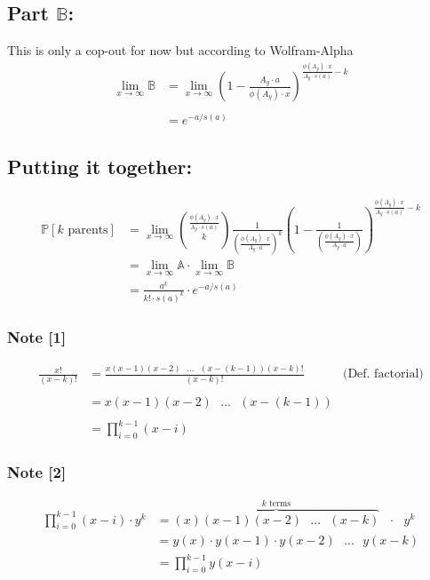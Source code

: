\documentclass[12pt]{amsart}
\theoremstyle{definition}
\numberwithin{equation}{section}
\begin{document}
\subsection*{Part $\mathbb{B}$:}
This is only a cop-out for now but according to Wolfram-Alpha\\
\begin{align*}
    \lim_{x \to \infty} \mathbb{B} &= \lim_{x \to \infty}\left(1- \frac{A_y \cdot a}{\phi(A_y) \cdot x}\right)^{\frac{\phi(A_y) \cdot x}{A_y \cdot s(a)  } -k}\\\\
    &= e^{-a/s(a)}
\end{align*}

\subsection*{Putting it together:} \begin{align*}
    \mathbb{P}[k \text{ parents}] &=  \lim_{x \to \infty}{\frac{\phi(A_y) \cdot x}{A_y \cdot s(a)} \choose k } \frac{1}{\left(\frac{\phi(A_y) \cdot x}{ A_y \cdot a}\right)^k} \left(1- \frac{1}{\left(\frac{\phi(A_y) \cdot x}{ A_y \cdot a}\right)}\right)^{\frac{\phi(A_y) \cdot x}{A_y \cdot s(a)  } -k}\\
    &= \lim_{x \to \infty}\mathbb{A}  \cdot \lim_{x \to \infty} \mathbb{B}\\
    &=\frac{a^k}{k! \cdot s(a)^k } \cdot e^{-a/s(a)}
\end{align*}

\subsubsection*{Note [1]}
\begin{align*}
    \frac{x!}{(x-k)!} &= \frac{x(x-1)(x-2) \text{ } ...\text{ } (x-(k-1))(x-k)!  }{(x-k)!} & \text{(Def. factorial)}\\\\
    &= x(x-1)(x-2) \text{ } ...\text{ } (x-(k-1))\\\\
    &= \prod_{i = 0}^{k-1}(x-i)
\end{align*}
\subsubsection*{Note [2]}\begin{align*}
    \prod_{i=0}^{k-1}(x-i) \cdot y^k &= \overbrace {(x)(x-1)(x-2) \text{ } ... \text{ } (x-k)}^{k \text{ terms}} \text{ } \cdot \text{ }y^k\\
    &= y(x) \cdot  y(x-1) \cdot y(x-2) \text{ } ... \text{ } y(x-k)\\
    &= \prod_{i=0}^{k-1} y(x-i)
\end{align*}
\end{document}
